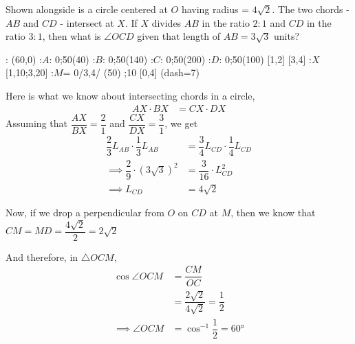 

\question[6]  Shown alongside is a circle centered at $O$ having radius = $4\sqrt2$.
The two chords - $AB$ and $CD$ - intersect at $X$. If $X$ divides $AB$ in the ratio $2:1$
and $CD$ in the ratio $3:1$, then what is $\angle OCD$ given that length of $AB = 3\sqrt3$ units?

  : (60,0)
  :$A$: 0;50(40)
  :$B$: 0;50(140)
  :$C$: 0;50(200)
  :$D$: 0;50(100)
   [1,2]
   [3,4]
  :$X$[1,10;3,20]
  :$M$= 0/3,4/
\figdrawbegin{}
  (50)
  \figdrawline [1,2]
  \figdrawline [3,4]
  ;10 [0,4]
  \figset (dash=7)
  \figdrawline [0,3]
  \ifprintanswers
    \figdrawline [0,6]
  \fi
\figdrawend
{}

\vspace{0.7cm}
\centerline{\box\figBoxA}

\begin{solution}[\fullpage]
	Here is what we know about intersecting chords in a circle,
	\begin{align}
		AX\cdot BX &= CX\cdot DX
	\end{align}
	Assuming that $\dfrac{AX}{BX} = \dfrac{2}{1}$ and $\dfrac{CX}{DX} = \dfrac{3}{1}$, we get
	\begin{align}
		\dfrac{2}{3}L_{AB}\cdot\dfrac{1}{3}L_{AB} &= \dfrac{3}{4}L_{CD}\cdot\dfrac{1}{4}L_{CD} \\
		\implies \dfrac{2}{9}\cdot(3\sqrt{3})^2 &= \dfrac{3}{16}\cdot L_{CD}^2 \\
		\implies L_{CD} &= 4\sqrt{2}
	\end{align}
	
	Now, if we drop a perpendicular from $O$ on $CD$ at $M$, then we know that 
	$CM = MD = \dfrac{4\sqrt2}{2} = 2\sqrt{2}$
	
	And therefore, in $\triangle OCM$, 
	\begin{align}
		\cos\angle OCM &= \dfrac{CM}{OC} \\
		               &= \dfrac{2\sqrt{2}}{4\sqrt{2}} = \dfrac{1}{2} \\
		\implies \angle OCM &= \cos^{-1}\dfrac{1}{2} = \ang{60}
	\end{align}
\end{solution}
\ifprintanswers\begin{codex}\end{codex}\fi
